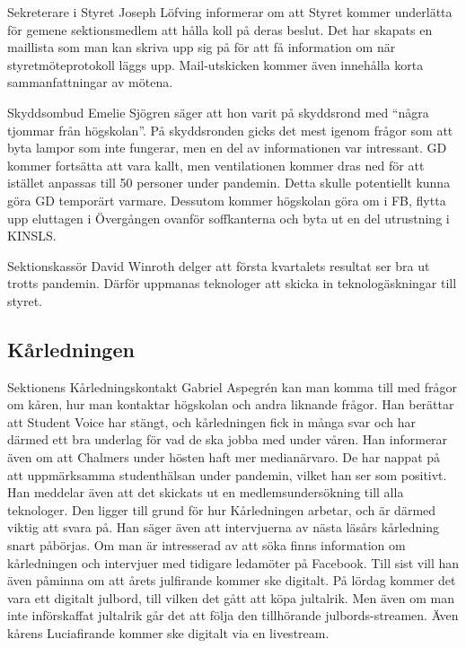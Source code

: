 \documentclass[hidelinks]{sektionsmote}
\begin{document}
Sekreterare i Styret Joseph Löfving informerar om att Styret kommer underlätta för gemene sektionsmedlem att hålla koll på deras beslut.
Det har skapats en maillista som man kan skriva upp sig på för att få information om när styretmöteprotokoll läggs upp.
Mail-utskicken kommer även innehålla korta sammanfattningar av mötena.

Skyddsombud Emelie Sjögren säger att hon varit på skyddsrond med \enquote{några tjommar från högskolan}.
På skyddsronden gicks det mest igenom frågor som att byta lampor som inte fungerar, men en del av informationen var intressant.
GD kommer fortsätta att vara kallt, men ventilationen kommer dras ned för att istället anpassas till 50 personer under pandemin.
Detta skulle potentiellt kunna göra GD temporärt varmare.
Dessutom kommer högskolan göra om i FB, flytta upp eluttagen i Övergången ovanför soffkanterna och byta ut en del utrustning i KINSLS.

Sektionskassör David Winroth delger att första kvartalets resultat ser bra ut trotts pandemin.
Därför uppmanas teknologer att skicka in teknologäskningar till styret.

\subsection{Kårledningen}
Sektionens Kårledningskontakt Gabriel Aspegrén kan man komma till med frågor om kåren, hur man kontaktar högskolan och andra liknande frågor.
Han berättar att Student Voice har stängt, och kårledningen fick in många svar och har därmed ett bra underlag för vad de ska jobba med under våren.
Han informerar även om att Chalmers under hösten haft mer medianärvaro.
De har nappat på att uppmärksamma studenthälsan under pandemin, vilket han ser som positivt.
Han meddelar även att det skickats ut en medlemsundersökning till alla teknologer.
Den ligger till grund för hur Kårledningen arbetar, och är därmed viktig att svara på.
Han säger även att intervjuerna av nästa läsårs kårledning snart påbörjas.
Om man är intresserad av att söka finns information om kårledningen och intervjuer med tidigare ledamöter på Facebook.
Till sist vill han även påminna om att årets julfirande kommer ske digitalt.
På lördag kommer det vara ett digitalt julbord, till vilken det gått att köpa jultalrik.
Men även om man inte införskaffat jultalrik går det att följa den tillhörande julbords-streamen.
Även kårens Luciafirande kommer ske digitalt via en livestream.
\end{document}

